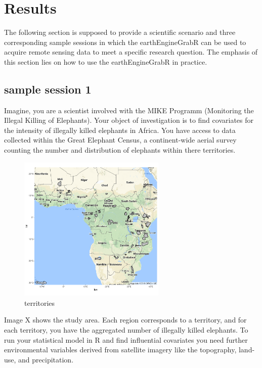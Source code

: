 \chapter{Results}

The following section is supposed to provide a scientific scenario and three corresponding sample sessions in which the earthEngineGrabR can be used to acquire remote sensing data to meet a specific research question. The emphasis of this section lies on how to use the earthEngineGrabR in practice. 

\section{sample session 1}

Imagine, you are a scientist involved with the MIKE Programm (Monitoring the Illegal Killing of Elephants). Your object of investigation is to find covariates for the intensity of illegally killed elephants in Africa. You have access to data collected within the Great Elephant Census, a continent-wide aerial survey counting the number and distribution of elephants within there territories. 


\begin{figure}
	\begin{center}
			\includegraphics[width=7cm]{images/territories.pdf}
	\end{center}
		\caption{territories}
\end{figure}

Image X shows the study area. Each region corresponds to a territory, and for each territory, you have the aggregated number of illegally killed elephants. To run your statistical model in R and find influential covariates you need further environmental variables derived from satellite imagery like the topography, land-use, and precipitation. 


